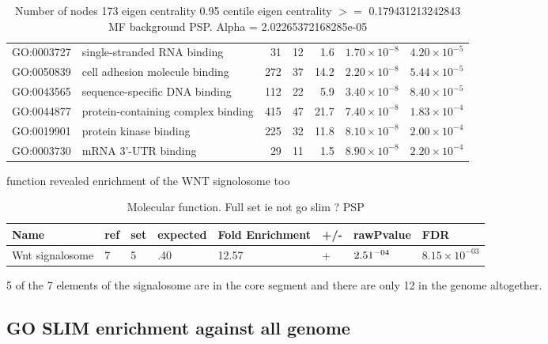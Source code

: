 \begin{table}[ht]
\begin{adjustbox}{max width=\textwidth}
\begin{tabular}{llrrrrr}
  GO:0003727 & single-stranded RNA binding & 31 & 12 & 1.6 & $1.70 \times 10^{-8}$ & $4.20 \times 10^{-5}$ \\ 
  GO:0050839 & cell adhesion molecule binding & 272 & 37 & 14.2 & $2.20 \times 10^{-8}$ & $5.44 \times 10^{-5}$ \\ 
  GO:0043565 & sequence-specific DNA binding & 112 & 22 & 5.9 & $3.40 \times 10^{-8}$ & $8.40 \times 10^{-5}$ \\ 
  GO:0044877 & protein-containing complex binding & 415 & 47 & 21.7 & $7.40 \times 10^{-8}$ & $1.83 \times 10^{-4}$ \\ 
  GO:0019901 & protein kinase binding & 225 & 32 & 11.8 & $8.10 \times 10^{-8}$ & $2.00 \times 10^{-4}$ \\ 
  GO:0003730 & mRNA 3'-UTR binding & 29 & 11 & 1.5 & $8.90 \times 10^{-8}$ & $2.20 \times 10^{-4}$ \\ 
   \hline
\end{tabular}
\end{adjustbox}
\caption{Number of nodes 173 eigen centrality 0.95 centile  eigen centrality $>=$ 0.179431213242843 MF background PSP. Alpha = 2.02265372168285e-05} 
\label{tab:Number of nodes 173 eigen centrality 0.95 centile  eigen centrality $>=$ 0.179431213242843 MF background PSP. Alpha = 2.02265372168285e-05}
\end{table} function revealed enrichment of the WNT signolosome too
\begin{table}
\centering
\begin{adjustbox}{max width=\textwidth}
\begin{tabular}{l l l l l l l l}
Name  &ref & set&	expected &	Fold Enrichment &	+/-	&rawPvalue&FDR\\
\hline
Wnt signalosome& 	7& 	5& 	.40& 	12.57&	+ &	$2.51\time10^{-04}$& 	$8.15\times10^{-03}$\\ 
\end{tabular}
\end{adjustbox}
\caption{Molecular function. Full set ie not go slim ? PSP}
\label{tab:Molecular function. Full set ie not go slim ? PSP}
\end{table}

5 of the 7 elements of the signalosome are in the core segment and there are only 12 in the genome altogether.

\subsection{GO SLIM enrichment against all genome} 


